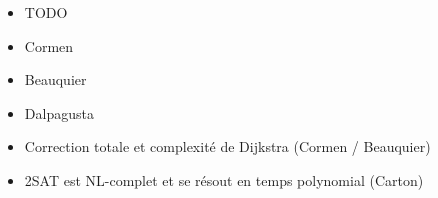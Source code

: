 \documentclass{agregfiche}
\begin{document}
\secquestionsclassiques

\begin{itemize}
    \item TODO
\end{itemize}

\secreferences

\begin{itemize}
    \item Cormen
    \item Beauquier
    \item Dalpagusta
\end{itemize}

\secdev

\begin{itemize}
    \item Correction totale et complexité de Dijkstra (Cormen / Beauquier)
    \item 2SAT est NL-complet et se résout en temps polynomial (Carton)
\end{itemize}
\end{document}
